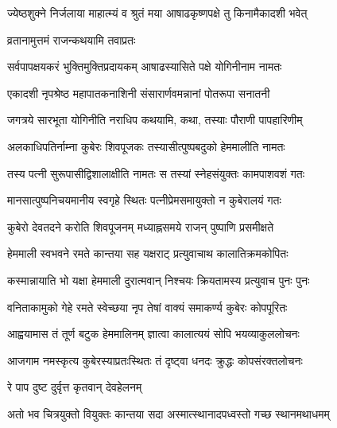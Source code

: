 
\twolineshloka
{ज्येष्ठशुक्ने निर्जलाया माहात्म्यं व श्रुतं मया}
{आषाढकृष्णपक्षे तु किनामैकादशी भवेत्} %



\onelineshloka
{व्रतानामुत्तमं राजन्कथयामि तवाप्रतः} %

\twolineshloka
{सर्वपापक्षयकरं भुक्तिमुक्तिप्रदायकम्}
{आषाढस्यासिते पक्षे योगिनीनाम नामतः} %

\twolineshloka
{एकादशी नृपश्रेष्ठ महापातकनाशिनी}
{संसारार्णवमन्नानां पोतरूपा सनातनी} %

\twolineshloka
{जगत्रये सारभूता योगिनीति नराधिप}
{कथयामि, कथा, तस्याः पौराणी पापहारिणीम्} %

\twolineshloka
{अलकाधिपतिर्नाम्ना कुबेरः शिवपूजकः}
{तस्यासीत्पुष्पबदुको हेममालीति नामतः} %

\twolineshloka
{तस्य पत्नी सुरूपासीद्विशालाक्षीति नामतः}
{स तस्यां स्नेहसंयुक्तः कामपाशवशं गतः} %

\twolineshloka
{मानसात्पुष्पनिचयमानीय स्वगृहे स्थितः}
{पत्नीप्रेमसमायुक्तो न कुबेरालयं गतः} %

\twolineshloka
{कुबेरो देवतदने करोति शिवपूजनम्}
{मध्याह्नसमये राजन् पुष्पाणि प्रसमीक्षते} %

\twolineshloka
{हेममाली स्वभवने रमते कान्तया सह}
{यक्षराट् प्रत्युवाचाथ कालातिक्रमकोपितः} %

\twolineshloka
{कस्मान्नायाति भो यक्षा हेममाली दुरात्मवान्}
{निश्चयः क्रियतामस्य प्रत्युवाच पुनः पुनः} %


\twolineshloka
{वनिताकामुको गेहे रमते स्वेच्छया नृप}
{तेषां वाक्यं समाकर्ण्य कुबेरः कोपपूरितः} %

\twolineshloka
{आह्वयामास तं तूर्ण बटुक हेममालिनम्}
{ज्ञात्वा कालात्ययं सोपि भयव्याकुललोचनः} %

\twolineshloka
{आजगाम नमस्कृत्य कुबेरस्याप्रतःस्थितः}
{तं दृष्ट्वा धनदः क्रुद्धः कोपसंरक्तलोचनः} %



\onelineshloka
{रे पाप दुष्ट दुर्वृत्त कृतवान् देवहेलनम्} %

\twolineshloka
{अतो भव चित्रयुक्तो वियुक्तः कान्तया सदा}
{अस्मात्स्थानादपध्वस्तो गच्छ स्थानमथाधमम्} %

